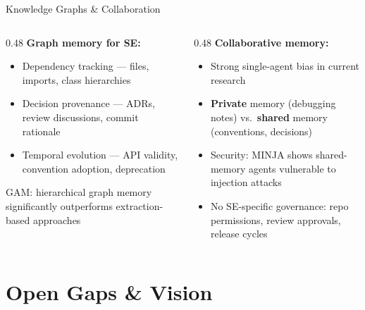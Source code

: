 \documentclass[aspectratio=169]{beamer}
\begin{document}
\begin{frame}{Knowledge Graphs \& Collaboration}
  \begin{columns}[T]
    \begin{column}{0.48\textwidth}
      \textbf{Graph memory for SE:}
      \begin{itemize}
        \item \alert{Dependency tracking} --- files, imports, class hierarchies
        \item \alert{Decision provenance} --- ADRs, review discussions, commit rationale
        \item \alert{Temporal evolution} --- API validity, convention adoption, deprecation
      \end{itemize}

      \vspace{0.2cm}
      {\small GAM: hierarchical graph memory significantly outperforms extraction-based approaches}
    \end{column}

    \begin{column}{0.48\textwidth}
      \textbf{Collaborative memory:}
      \begin{itemize}
        \item Strong single-agent bias in current research
        \item \textbf{Private} memory (debugging notes) vs.\ \textbf{shared} memory (conventions, decisions)
        \item Security: MINJA shows shared-memory agents vulnerable to \alert{injection attacks}
        \item No SE-specific governance: repo permissions, review approvals, release cycles
      \end{itemize}
    \end{column}
  \end{columns}
\end{frame}

\section{Open Gaps \& Vision}

\begin{frame}[plain]
  \sectionpage
\end{frame}
\end{document}
